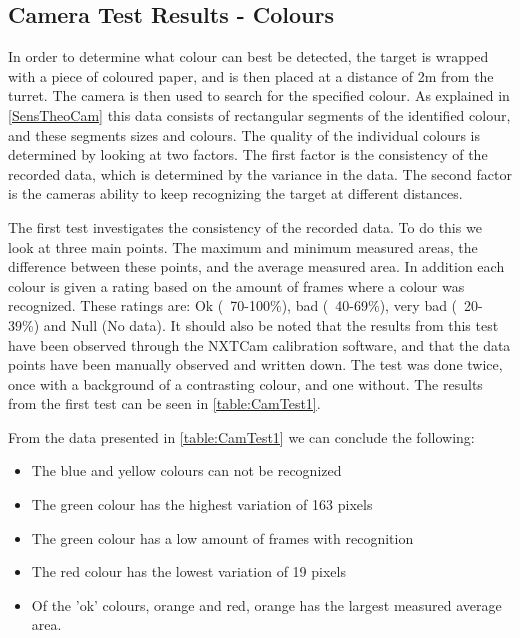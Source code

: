 
\subsection{Camera Test Results - Colours}\label{CamTestColours}
In order to determine what colour can best be detected, the target is wrapped
with a piece of coloured paper, and is then placed at a distance of 2m from the
turret. The camera is then used to search for the specified colour. As explained
in \autoref{SensTheoCam} this data consists of rectangular segments of the
identified colour, and these segments sizes and colours. The quality of the
individual colours is determined by looking at two factors. The first factor is
the consistency of the recorded data, which is determined by the variance in the
data. The second factor is the cameras ability to keep recognizing the target
at different distances.\nl

The first test investigates the consistency of the recorded data. To do this we
look at three main points. The maximum and minimum measured areas, the difference
between these points, and the average measured area. In addition each colour is
given a rating based on the amount of frames where a colour was recognized.
These ratings are: Ok (~70-100\%), bad (~40-69\%), very bad (~20-39\%) and Null
(No data). It should also be noted that the results from this test have been
observed through the NXTCam calibration software, and that the data points have
been manually observed and written down. The test was done twice, once with a
background of a contrasting colour, and one without. The results from the first
test can be seen in \autoref{table:CamTest1}.


From the data presented in \autoref{table:CamTest1} we can conclude the
following:
\begin{itemize}
  \item The blue and yellow colours can not be recognized
  \item The green colour has the highest variation of 163 pixels
  \item The green colour has a low amount of frames with recognition
  \item The red colour has the lowest variation of 19 pixels
  \item Of the 'ok' colours, orange and red, orange has the largest measured
  average area.
\end{itemize}

